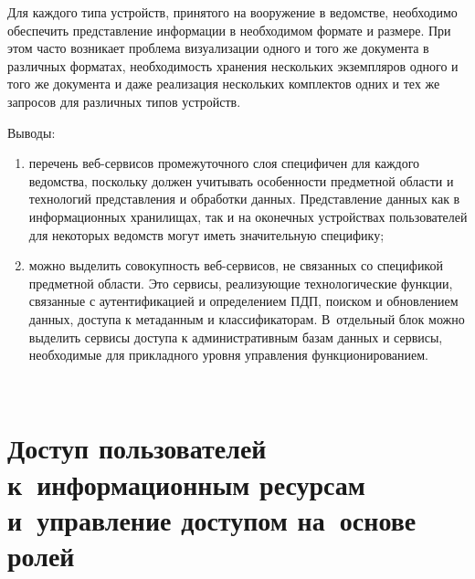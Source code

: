 \begin{multicols}{2}
      Для каждого типа устройств, принятого на вооружение в ведомстве, необходимо 
обеспечить представление информации в необходимом формате и размере. При этом часто 
возникает проб\-ле\-ма визуализации одного и того же документа в различных форматах, 
необходимость хранения нескольких экземпляров одного и того же документа и даже 
реализация нескольких комплектов одних и тех же запросов для различных типов устройств.
      
      Выводы:
      \begin{enumerate}[(1)]
\item перечень веб-сер\-ви\-сов промежуточного слоя специфичен для каждого ведомства, 
поскольку должен учитывать особенности предметной области и технологий представления и 
обработки данных. Представление данных как в информационных хранилищах, так и на 
оконечных устройствах пользователей для некоторых ведомств могут иметь значительную 
специфику;
\item можно выделить совокупность веб-сер\-ви\-сов, не связанных со спецификой предметной 
об\-ласти. Это сервисы, реализующие техноло\-гические функции, связанные с аутен\-ти\-фикацией 
и определением ПДП, поиском и обнов\-ле\-нием данных, доступа к 
метаданным и классификаторам. В~отдельный блок можно выделить сервисы доступа к 
административным базам данных и сервисы, необходимые для прикладного уровня 
управления функционированием.
\end{enumerate}

 \begin{figure*} %
 \vspace*{1pt}
\begin{center}
\mbox{%
\epsfxsize=85.041mm
}
\end{center}
\vspace*{-3pt}
 \end{figure*}


\section{Доступ пользователей к~информационным ресурсам и~управление доступом 
на~основе ролей}
      

\end{multicols}
